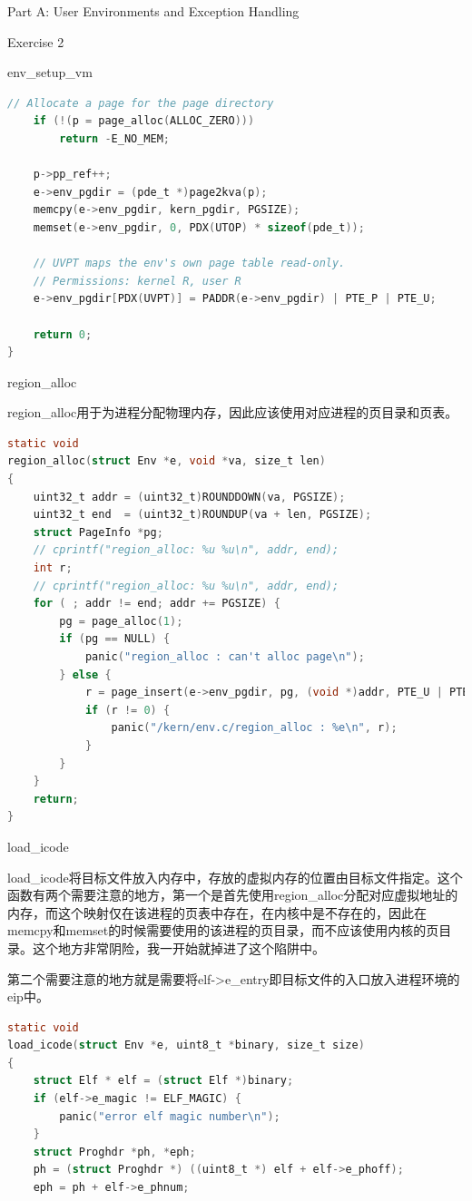\documentclass[GBK,winfonts,a4paper,10pt]{ctexart}
\begin{document}
\begin{section}{ Part A: User Environments and Exception Handling }
\begin{subsection}{ Exercise 2 }
\begin{subsubsection}{env\_setup\_vm}
\begin{lstlisting}[language=C]
	// Allocate a page for the page directory
	if (!(p = page_alloc(ALLOC_ZERO)))
		return -E_NO_MEM;

    p->pp_ref++;
    e->env_pgdir = (pde_t *)page2kva(p);
    memcpy(e->env_pgdir, kern_pgdir, PGSIZE);
    memset(e->env_pgdir, 0, PDX(UTOP) * sizeof(pde_t));

	// UVPT maps the env's own page table read-only.
	// Permissions: kernel R, user R
	e->env_pgdir[PDX(UVPT)] = PADDR(e->env_pgdir) | PTE_P | PTE_U;

	return 0;
}
\end{lstlisting}
\end{subsubsection}

\begin{subsubsection}{region\_alloc}
\par
region\_alloc用于为进程分配物理内存，因此应该使用对应进程的页目录和页表。
\begin{lstlisting}[language=C]
static void
region_alloc(struct Env *e, void *va, size_t len)
{
    uint32_t addr = (uint32_t)ROUNDDOWN(va, PGSIZE);
    uint32_t end  = (uint32_t)ROUNDUP(va + len, PGSIZE);
    struct PageInfo *pg;
    // cprintf("region_alloc: %u %u\n", addr, end);
    int r;
    // cprintf("region_alloc: %u %u\n", addr, end);
    for ( ; addr != end; addr += PGSIZE) {
        pg = page_alloc(1);
        if (pg == NULL) {
            panic("region_alloc : can't alloc page\n");
        } else {
            r = page_insert(e->env_pgdir, pg, (void *)addr, PTE_U | PTE_W);
            if (r != 0) {
                panic("/kern/env.c/region_alloc : %e\n", r);
            }
        }
    }
    return;
}
\end{lstlisting}
\end{subsubsection}


\begin{subsubsection}{load\_icode}
\par
load\_icode将目标文件放入内存中，存放的虚拟内存的位置由目标文件指定。这个函数有两个需要注意的地方，第一个是首先使用region\_alloc分配对应虚拟地址的内存，而这个映射仅在该进程的页表中存在，在内核中是不存在的，因此在memcpy和memset的时候需要使用的该进程的页目录，而不应该使用内核的页目录。这个地方非常阴险，我一开始就掉进了这个陷阱中。
\par
第二个需要注意的地方就是需要将elf->e\_entry即目标文件的入口放入进程环境的eip中。
\begin{lstlisting}[language=C]
static void
load_icode(struct Env *e, uint8_t *binary, size_t size)
{
    struct Elf * elf = (struct Elf *)binary;
    if (elf->e_magic != ELF_MAGIC) {
        panic("error elf magic number\n");
    }
    struct Proghdr *ph, *eph;
    ph = (struct Proghdr *) ((uint8_t *) elf + elf->e_phoff);
    eph = ph + elf->e_phnum;


\end{lstlisting}
\end{subsubsection}
\end{subsection}
\end{section}
\end{document}
